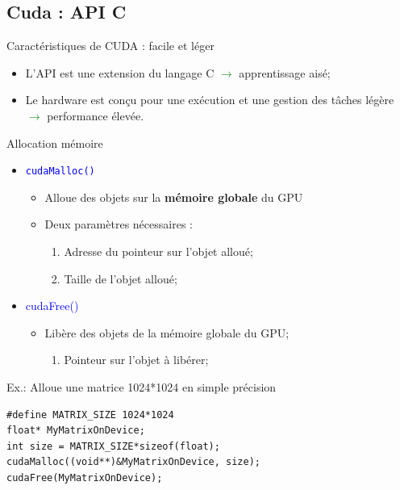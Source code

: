 \documentclass[handout,francais]{beamer}
\begin{document}
\subsection{Cuda : API C}

\begin{frame}{Caractéristiques de CUDA : facile et léger}
\begin{itemize}
\item L'API est une extension du langage C 
  \textcolor{green}{$\rightarrow$} apprentissage aisé;
\item Le hardware est conçu pour une exécution et une gestion des
tâches légère \textcolor{green}{$\rightarrow$} performance élevée.
\end{itemize}
\end{frame}

\begin{frame}[containsverbatim]{Allocation mémoire}
\begin{itemize}
\item \textcolor{blue}{\texttt{cudaMalloc()}}
  \begin{itemize}
  \item Alloue des objets sur la \textbf{mémoire globale} du GPU
  \item Deux paramètres nécessaires :
    \begin{enumerate}
    \item Adresse du pointeur sur l'objet alloué;
    \item Taille de l'objet alloué;
    \end{enumerate}
  \end{itemize}
\item \textcolor{blue}{cudaFree()}
  \begin{itemize}
  \item Libère des objets de la mémoire globale du GPU;
    \begin{enumerate}
    \item Pointeur sur l'objet à libérer;
    \end{enumerate}
  \end{itemize}
\end{itemize}

\begin{exampleblock}{Ex.: Alloue une matrice 1024*1024 en simple précision}
    \begin{lstlisting}
#define MATRIX_SIZE 1024*1024
float* MyMatrixOnDevice;
int size = MATRIX_SIZE*sizeof(float);
cudaMalloc((void**)&MyMatrixOnDevice, size);
cudaFree(MyMatrixOnDevice);
    \end{lstlisting}
\end{exampleblock}
\end{frame}
\end{document}
